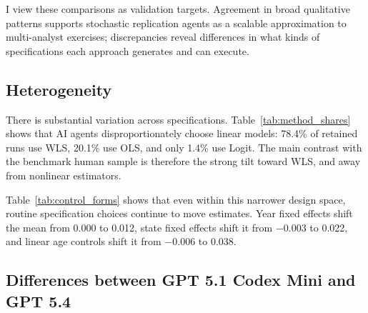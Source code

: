 \documentclass[12pt]{article}
\newcommand{\nhkmeta}{../NHK-replications/meta_analysis}
\begin{document}
\begin{table}[!htbp]
\centering
\caption{Shares of executed research choices by estimation method, weighting, and variance adjustment}

\caption*{\textbf{Notes:} Estimation methods are classified from the estimator code itself, including common closed-form implementations of linear regression. Logit is the only retained non-linear estimation method. ``PERWT'' refers to the ACS person weight. ``Clustered (state)'' indicates cluster-robust standard errors at the state level.}
\label{tab:method_shares}
\end{table}
\FloatBarrier

\begin{table}[!htbp]
\centering
\caption{Mean effects by functional form of common controls}

\caption*{\textbf{Notes:} For each control variable, the table reports the mean and standard deviation of point estimates among executed research choices using that functional form.}
\label{tab:control_forms}
\end{table}
\FloatBarrier

I view these comparisons as validation targets. Agreement in broad qualitative patterns supports stochastic replication agents as a scalable approximation to multi-analyst exercises; discrepancies reveal differences in what kinds of specifications each approach generates and can execute.

\subsection{Heterogeneity}

There is substantial variation across specifications. Table~\ref{tab:method_shares} shows that AI agents disproportionately choose linear models: 78.4\% of retained runs use WLS, 20.1\% use OLS, and only 1.4\% use Logit. The main contrast with the benchmark human sample is therefore the strong tilt toward WLS, and away from nonlinear estimators.

Table~\ref{tab:control_forms} shows that even within this narrower design space, routine specification choices continue to move estimates. Year fixed effects shift the mean from 0.000 to 0.012, state fixed effects shift it from $-0.003$ to 0.022, and linear age controls shift it from $-0.006$ to 0.038.

\subsection{Differences between GPT 5.1 Codex Mini and GPT 5.4}
\end{document}
